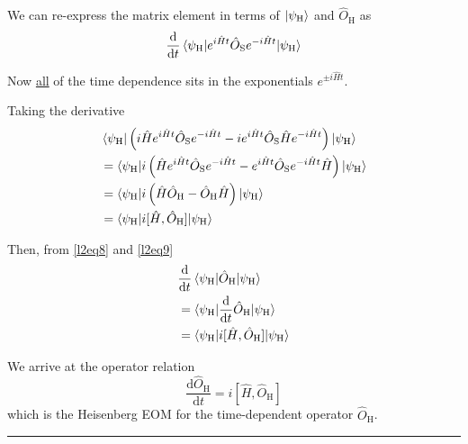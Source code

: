 \documentclass{article}
\begin{document}
\noindent We can re-express the matrix element in terms of $\ket{ \psi_\mathrm{H} }$ and $\hat{O}_\mathrm{H}$ as
\begin{equation} \label{l2eq8}
    \dfrac{\mathrm{d}}{ \mathrm{d} t } \braket{ \psi_\mathrm{H} | e^{ i \hat{H} t } \hat{O}_\mathrm{S} e^{ -i \hat{H} t } | \psi_\mathrm{H} }
\end{equation} %

\noindent Now \underline{all} of the time dependence sits in the exponentials $e^{ \pm i \hat{H} t }$.

\noindent Taking the derivative
\begin{align}
    & \braket{ \psi_\mathrm{H} | \left( i \hat{H} e^{ i \hat{H} t } \hat{O}_\mathrm{S} e^{ -i \hat{H} t } - i e^{ i \hat{H} t } \hat{O}_\mathrm{S} \hat{H} e^{ -i \hat{H} t } \right) | \psi_\mathrm{H} } \nonumber\\
    &= \braket{ \psi_\mathrm{H} | i \left( \hat{H} e^{ i \hat{H} t } \hat{O}_\mathrm{S} e^{ -i \hat{H} t } - e^{ i \hat{H} t } \hat{O}_\mathrm{S} e^{ -i \hat{H} t } \hat{H} \right) | \psi_\mathrm{H} } \nonumber\\
    &= \braket{ \psi_\mathrm{H} | i \left( \hat{H} \hat{O}_\mathrm{H} - \hat{O}_\mathrm{H} \hat{H} \right) | \psi_\mathrm{H} } \nonumber\\
    &= \braket{ \psi_\mathrm{H} | i [ \hat{H}, \hat{O}_\mathrm{H} ] | \psi_\mathrm{H} } \label{l2eq9}
\end{align} %


Then, from \eqref{l2eq8} and \eqref{l2eq9}
\begin{align*}
     & \dfrac{\mathrm{d}}{ \mathrm{d} t } \braket{ \psi_\mathrm{H} | \hat{O}_\mathrm{H} | \psi_\mathrm{H} } \\
     &= \braket{ \psi_\mathrm{H} | \dfrac{\mathrm{d}}{ \mathrm{d} t } \hat{O}_\mathrm{H} | \psi_\mathrm{H} } \\
     &= \braket{ \psi_\mathrm{H} | i [ \hat{H}, \hat{O}_\mathrm{H} ] | \psi_\mathrm{H} }
\end{align*}

\noindent We arrive at the operator relation
\begin{equation*}
    \dfrac{ \mathrm{d} \hat{O}_\mathrm{H} }{ \mathrm{d} t } = i [ \hat{H}, \hat{O}_\mathrm{H} ]
\end{equation*}
which is the Heisenberg EOM for the time-dependent operator $\hat{O}_\mathrm{H}$.

\noindent\rule{\textwidth}{.5pt}
\end{document}
